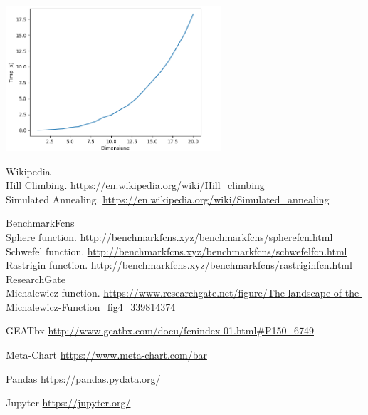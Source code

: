 \documentclass{article}
\begin{document}
\begin{enumerate}
 \\\includegraphics[width=0.6\textwidth]{timeplot}
\end{enumerate}


\begin{thebibliography}{9}
  
  Wikipedia
  \\ Hill Climbing.
  \url{https://en.wikipedia.org/wiki/Hill_climbing}
  \\ Simulated Annealing.
  \url{https://en.wikipedia.org/wiki/Simulated_annealing}

	BenchmarkFcns
	\\ Sphere function.
	\url{http://benchmarkfcns.xyz/benchmarkfcns/spherefcn.html}
	\\ Schwefel function.
	\url{http://benchmarkfcns.xyz/benchmarkfcns/schwefelfcn.html}
	\\ Rastrigin function.
	\url{http://benchmarkfcns.xyz/benchmarkfcns/rastriginfcn.html}
	ResearchGate
	\\ Michalewicz function.
	\url{https://www.researchgate.net/figure/The-landscape-of-the-Michalewicz-Function_fig4_339814374} 

	GEATbx
	\url{http://www.geatbx.com/docu/fcnindex-01.html#P150_6749}
	
	Meta-Chart
	\url{https://www.meta-chart.com/bar}
	
	Pandas
	\url{https://pandas.pydata.org/}
	
	Jupyter
	\url{https://jupyter.org/}
  
\end{thebibliography}  
\end{document}
